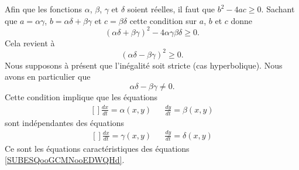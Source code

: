 Afin que les fonctions \( \alpha\), \( \beta\), \( \gamma\) et \( \delta\) soient réelles, il faut que \( b^2-4ac\geq 0\). Sachant que \( a=\alpha\gamma\), \( b=\alpha\delta+\beta\gamma\) et \( c=\beta\delta\) cette condition sur \( a\), \( b\) et \( c\) donne
\begin{equation}
    (\alpha\delta+\beta\gamma)^2-4\alpha\gamma\beta\delta\geq 0.
\end{equation}
Cela revient à
\begin{equation}
    (\alpha\delta-\beta\gamma)^2\geq 0.
\end{equation}
Nous supposons à présent que l'inégalité soit stricte (cas hyperbolique). Nous avons en particulier que
\begin{equation}
    \alpha\delta-\beta\gamma\neq 0.
\end{equation}
Cette condition implique que les équations
\begin{equation}
    \begin{aligned}[]
        \frac{ dx }{ dt }=\alpha(x,y)&&\frac{ dy }{ dt }=\beta(x,y)
    \end{aligned}
\end{equation}
sont indépendantes des équations
\begin{equation}
    \begin{aligned}[]
        \frac{ dx }{ dt }=\gamma(x,y)&&\frac{ dy }{ dt }=\delta(x,y)
    \end{aligned}
\end{equation}
Ce sont les équations caractéristiques des équations \eqref{SUBESQooGCMNooEDWQHd}.


